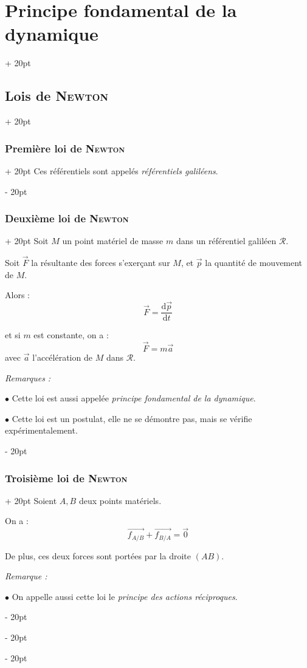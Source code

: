 \documentclass[a4paper, 12pt, twoside]{article}
\newcommand{\dt}[2][t]{\dfrac{\mathrm d #2}{\mathrm d #1}} %
\newcommand{\vect}{\overrightarrow}
\newcommand{\ind}[1][20pt]{\advance\leftskip + #1}
\newcommand{\deind}[1][20pt]{\advance\leftskip - #1}
\newenvironment{indt}[2][20pt]{#2 \par \ind[#1]}{\par \deind} %
\begin{document}
\begin{indt}{\section{Principe fondamental de la dynamique}}
\begin{indt}{\subsection{Lois de \textsc{Newton}}}
\begin{indt}{\subsubsection{Première loi de \textsc{Newton}}}
                Ces référentiels sont appelés \textit{référentiels galiléens}.
            \end{indt}

            \vspace{12pt}
            
            \begin{indt}{\subsubsection{Deuxième loi de \textsc{Newton}}}
                Soit $M$ un point matériel de masse $m$ dans un référentiel galiléen $\mathscr R$.

                Soit $\vec F$ la résultante des forces s'exerçant sur $M$, et $\vec p$ la quantité de mouvement de $M$.

                Alors :
                \[
                    \vec F = \dt{\vec p}
                \]

                et si $m$ est constante, on a :
                \[
                    \vec F = m\vec a
                \]
                avec $\vec a$ l'accélération de $M$ dans $\mathscr R$.

                \vspace{12pt}
                
                \textit{Remarques :}

                $\bullet$ Cette loi est aussi appelée \textit{principe fondamental de la dynamique}.

                $\bullet$ Cette loi est un postulat, elle ne se démontre pas, mais se vérifie expérimentalement.
            \end{indt}

            \vspace{12pt}
            
            \begin{indt}{\subsubsection{Troisième loi de \textsc{Newton}}}
                Soient $A, B$ deux points matériels.

                On a :
                \[
                    \vect{f_{A/B}} + \vect{f_{B/A}} = \vect 0
                \]

                De plus, ces deux forces sont portées par la droite $(AB)$.

                \vspace{12pt}
                
                \textit{Remarque :}

                $\bullet$ On appelle aussi cette loi le \textit{principe des actions réciproques}.
            \end{indt}
        \end{indt}
    \end{indt}
\end{document}
